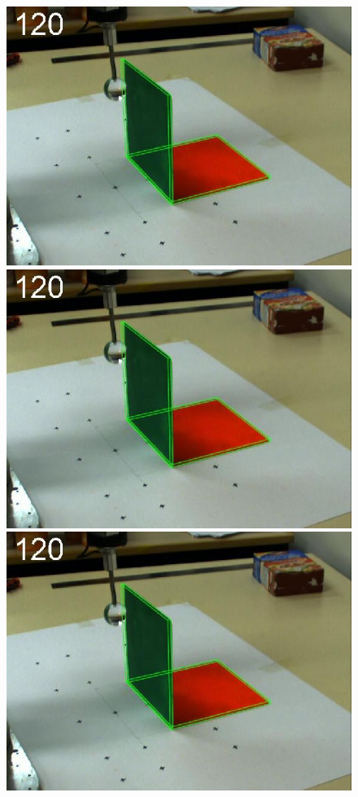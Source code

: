 \begin{figure}[tb]
{\includegraphics[width=\imgBXwid]{images/B2_2exp_58_1}
\includegraphics[width=\imgBXwid]{images/B2_1exp_58_1}
\includegraphics[width=\imgBXwid]{images/B2_LWPR1_58_1}
}
\end{figure}
